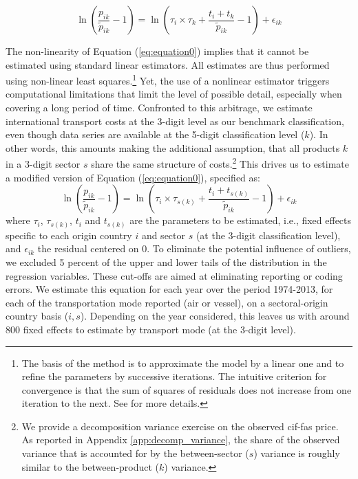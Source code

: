 \documentclass[a4paper,11pt]{article}
\begin{document}
\begin{equation}
\ln\left(\frac{p_{ik}}{\widetilde{p}_{ik}}-1 \right)= \ln \left(\tau_{i} \times \tau_{k}+\frac{t_{i} + t_{k}}{\widetilde{p}_{ik}}-1 \right) + \epsilon_{ik} \label{eq:equation0}
\end{equation}

The non-linearity of Equation (\ref{eq:equation0}) implies that it cannot be estimated using standard linear estimators. All estimates are thus performed using non-linear least squares.\footnote{The basis of the method is to approximate the model by a linear one and to refine the parameters by successive iterations. The intuitive criterion for convergence is that the sum of squares of residuals does not increase from one iteration to the next. See \cite{Woolridge-Book-2001} for more details.} Yet, the use of a nonlinear estimator triggers computational limitations that limit the level of possible detail, especially when covering a long period of time. Confronted to this arbitrage, we estimate international transport costs at the 3-digit level as our benchmark classification, even though data series are available at the 5-digit classification level ($k$). In other words, this amounts making the additional assumption, that all products $k$ in a 3-digit sector $s$ share the
same structure of costs.\footnote{We provide a decomposition variance exercise on the observed cif-fas price. As reported in Appendix \ref{app:decomp_variance}, the share of the observed variance that is accounted for by the between-sector ($s$) variance is roughly similar to the between-product ($k$) variance.} This drives us to estimate a modified version of Equation (\ref{eq:equation0}), specified as:
\begin{equation}
\ln\left(\frac{p_{ik}}{\widetilde{p}_{ik}}-1 \right)= \ln \left(\tau_{i} \times \tau_{s(k)}+\frac{t_{i} + t_{s(k)}}{\widetilde{p}_{ik}}-1 \right) + \epsilon_{ik} \label{eq:estimatedequation}
\end{equation}
where $\tau_{i}$, $\tau_{s(k)}$, $t_{i}$ and $t_{s(k)}$ are the parameters to be estimated, i.e., fixed effects specific to each origin country $i$ and sector $s$ (at the 3-digit classification level), and $\epsilon_{ik}$ the residual centered on 0. To eliminate the potential influence of outliers, we excluded 5 percent of the upper and lower tails of the distribution in the regression variables. These cut-offs are aimed at eliminating reporting or coding errors. We estimate this equation for each year over the period 1974-2013, for each of the transportation mode reported (air or vessel), on a sectoral-origin country basis ($i,s$). Depending on the year considered, this leaves us with around 800 fixed effects to estimate by transport mode (at the 3-digit level).   \smallskip
\end{document}
